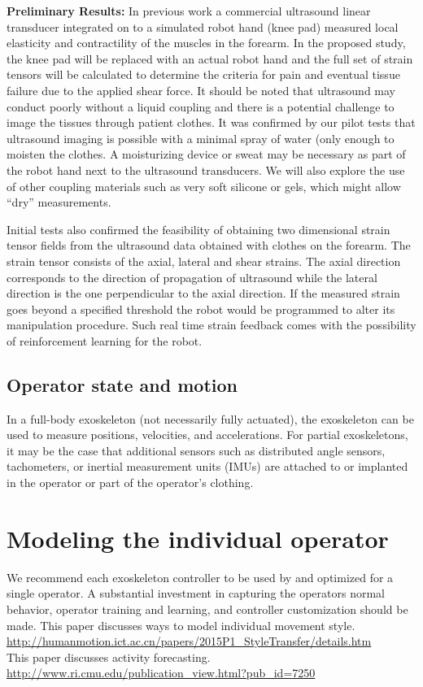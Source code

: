 \documentclass[letterpaper,12pt,fullpage]{article}
\begin{document}
{\bf Preliminary Results:}
In previous work a commercial ultrasound
linear transducer integrated on to a simulated robot hand (knee pad)
measured local elasticity and contractility of the muscles in
the forearm. In the proposed
study, the knee pad will be replaced with an actual robot hand and the full
set of strain tensors will be calculated to determine the criteria for
pain and eventual tissue failure due to the applied shear force.
It should be noted that ultrasound may conduct poorly without a liquid
coupling and there is a potential challenge to image the tissues through
patient clothes. It was confirmed by our pilot tests that ultrasound
imaging is possible with a minimal spray of water (only enough to moisten
the clothes. A moisturizing device or sweat may be necessary
as part of the robot hand next to the ultrasound transducers.
We will also explore the use of other coupling materials such as very
soft silicone or gels,
which might allow ``dry'' measurements. 

Initial tests also confirmed the feasibility of obtaining two
dimensional strain tensor fields from the ultrasound data obtained with
clothes on the forearm.
The strain tensor consists of the
axial, lateral and shear strains. The axial direction corresponds to
the direction of
propagation of ultrasound
while the lateral direction is
the one perpendicular to the axial direction.
If the measured strain goes beyond a specified threshold the robot would be
programmed to alter its manipulation procedure. Such real time strain
feedback comes with the possibility of reinforcement learning for the
robot.

\subsection{Operator state and motion}

In a full-body exoskeleton
(not necessarily fully actuated), the
exoskeleton can be used to measure positions, velocities,
and accelerations. For partial exoskeletons,
it may be the case that additional sensors such as distributed 
angle sensors, tachometers, or inertial measurement units (IMUs)
are attached to or implanted in the operator 
or part of the operator's clothing.

\section{Modeling the individual operator}

We recommend each exoskeleton controller
to be used by and optimized for a single operator.
A substantial investment in capturing the operators normal behavior,
operator training and learning, and controller customization should be made.
This paper discusses ways to model individual movement style.\\
\url{http://humanmotion.ict.ac.cn/papers/2015P1_StyleTransfer/details.htm}\\
This paper discusses activity forecasting.\\
\url{http://www.ri.cmu.edu/publication_view.html?pub_id=7250}
\end{document}
